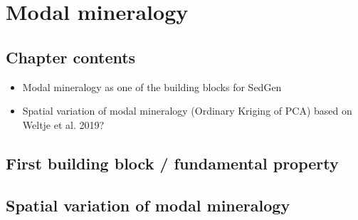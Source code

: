 \chapter{Modal mineralogy}\label{ch:modal_mineralogy}

\section{Chapter contents}
\begin{itemize}
    \item Modal mineralogy as one of the building blocks for SedGen
    \item Spatial variation of modal mineralogy (Ordinary Kriging of PCA) based on Weltje et al. 2019?
\end{itemize}

\section{First building block / fundamental property}
\section{Spatial variation of modal mineralogy}




\cleardoublepage

